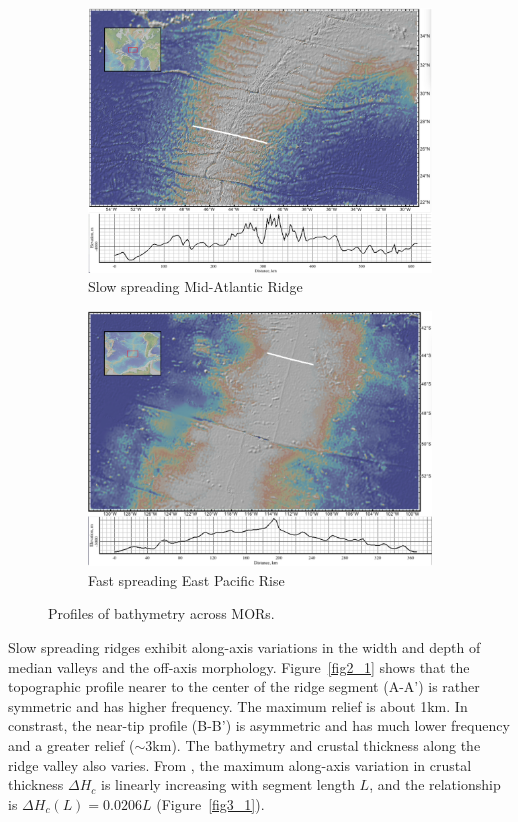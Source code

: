 \documentclass[12pt]{article}
\begin{document}
\begin{figure}[H]
\centering
\begin{subfigure}{.5\textwidth}
  \centering
  \includegraphics[width=.8\linewidth]{fig1_1.png}
  \caption{\small{Slow spreading Mid-Atlantic Ridge}}
  \label{fig1_1}
\end{subfigure}%
\begin{subfigure}{.5\textwidth}
  \centering
  \includegraphics[width=.8\linewidth]{fig1_3.png}
  \caption{\small{Fast spreading East Pacific Rise}}
  \label{fig1_3}
\end{subfigure}
\caption{\small{Profiles of bathymetry across MORs.}}
\label{fig1}
\end{figure}
Slow spreading ridges exhibit along-axis variations  in  the width and depth of median valleys and the off-axis morphology.  Figure~\ref{fig2_1} shows that the topographic profile nearer to the center of the ridge segment (A-A') is rather symmetric and has higher frequency. The maximum relief is about 1km. In constrast, the near-tip profile (B-B') is asymmetric and has much lower frequency and a greater relief ($\sim$3km). The bathymetry and crustal thickness along the ridge valley also varies. From \citep{Chen1999}, the maximum along-axis variation in crustal thickness $\Delta H_{c}$ is linearly increasing with segment length $L$, and the relationship is $\Delta H_{c}(L)=0.0206L$ (Figure~\ref{fig3_1}).
\end{document}
